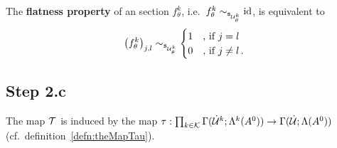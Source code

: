 The \textbf{flatness property} of an section $f_\theta^k$,
i.e.\ $f_\theta^k\sim_{\mathfrak{s}_{\mathcal{U}_\theta^k}}\operatorname{id}$, is equivalent to
\[
  \left(f_\theta^k\right)_{j,l}\sim_{\mathfrak{s}_{\mathcal{U}_\theta^k}}
  \begin{cases}
    1 & \text{,~if~} j=l
  \\0 & \text{,~if~} j\neq l
  \,.
  \end{cases}
\]
\TODO{}

\subsection{Step 2.c}
The map $\mathcal{T}$ is induced by the map
$\tau:\prod_{k\in\mathcal{K}}\Gamma(\dot {\mathcal{U}}^k;\Lambda^k(A^0))
\to\Gamma(\dot{\mathcal{U}};\Lambda(A^0))$ (cf.\ definition~\ref{defn:theMapTau}).
\begin{comment}
  For every $\theta\in\A$,
  \begin{align*}
    \tau_\theta:
    \prod_{k\in\cK_\theta}\Gamma(\dot \cU^k;\Lambda^k(A^0))
    &\to\Gamma(\dot\cU_\theta;\Lambda(A^0))
  \\(f_\theta^{k})&\mapsto f_{\theta|\dot\cU_\theta}^{k}
    &&\text{,~if~} \cK_\theta=\{k\}
  \\(f_\theta^{k_1},f_\theta^{k_2})&\mapsto
    f_{\theta|\dot\cU_\theta}^{k_1}\cdot f_{\theta|\dot\cU_\theta}^{k_2}
    &&\text{,~if~} \cK_\theta=\{k_1,h_2\}
  \end{align*}
\end{comment}

